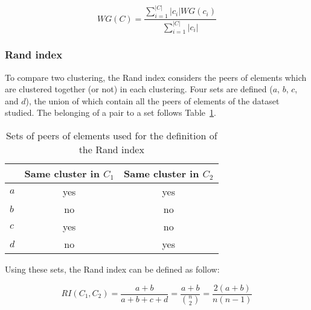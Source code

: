    \begin{equation}
        WG(C) = \frac{\sum_{i=1}^{|C|} |c_i| WG(c_i)}{\sum_{i=1}^{|C|} |c_i|}
        \label{eq:wg_index_global}
    \end{equation}

    \subsubsection{Rand index}
    To compare two clustering, the Rand index considers the peers of elements which are clustered together (or not) in each clustering. Four sets are defined ($a$, $b$, $c$, and $d$), the union of which contain all the peers of elements of the dataset studied. The belonging of a pair to a set follows Table~\ref{tab:rand_index}.
    
    \vspace{0.8cm}

    \begin{table}[h]
    \centering
    \begin{tabular}{lcc}
                                       & \multicolumn{1}{l}{\textbf{Same cluster in $C_1$}} & \multicolumn{1}{l}{\textbf{Same cluster in $C_2$}} \\ \bottomrule
    \multicolumn{1}{l}{\textbf{$a$}} & yes                                                 & yes                                                 \\ \bottomrule
    \multicolumn{1}{l}{\textbf{$b$}} & no                                                  & no                                                  \\ \bottomrule
    \multicolumn{1}{l}{\textbf{$c$}} & yes                                                 & no                                                  \\ \bottomrule
    \multicolumn{1}{l}{\textbf{$d$}} & no                                                  & yes                                                 \\ \bottomrule
    \end{tabular}
    \caption{Sets of peers of elements used for the definition of the Rand index}
\label{tab:rand_index}
    \end{table}

    \vspace{0.8cm}

    Using these sets, the Rand index can be defined as follow:

    \begin{equation}
        RI(C_1, C_2) = \frac{a + b}{a + b + c + d} = \frac{a + b}{\binom{n}{2}} = \frac{2(a + b)}{n(n-1)}
        \label{eq:rand_index}
    \end{equation}

